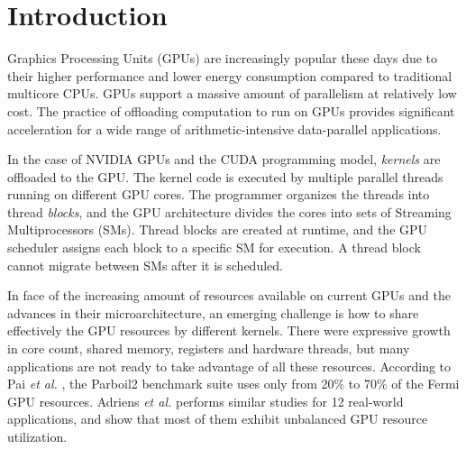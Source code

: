 \documentclass[conference]{IEEEtran}
\begin{document}




%
\IEEEpeerreviewmaketitle

\section{Introduction}
\label{sec:Introduction}

Graphics Processing Units (GPUs) are increasingly popular these days due to their higher performance and lower energy consumption compared to traditional multicore CPUs. GPUs support a massive amount of parallelism at relatively low cost. The practice of offloading computation to run on GPUs provides significant acceleration for a wide range of arithmetic-intensive data-parallel applications. 

In the case of NVIDIA GPUs and the CUDA programming model, \textit{kernels} are offloaded to the GPU. The kernel code is executed by multiple parallel threads running on different GPU cores. The programmer organizes the threads into thread {\it blocks}, and the GPU architecture divides the cores into sets of Streaming Multiprocessors (SMs). Thread blocks are created at runtime, and the GPU scheduler assigns each block to a specific SM for execution. A thread block cannot migrate between SMs after it is scheduled. 

In face of the increasing amount of resources available on current GPUs and the advances in their microarchitecture, an emerging challenge is how to share effectively the GPU resources by different kernels. There were expressive growth in core count, shared memory, registers and hardware threads, but many applications are not ready to take advantage of all these resources.  According to Pai \textit{et al.} \cite{pai2013improving}, the Parboil2 benchmark suite uses only from 20\% to 70\% of the Fermi GPU resources. Adriens \textit{et al.} \cite{adriaens2012case} performs similar studies for 12 real-world applications, and show that most of them exhibit unbalanced GPU resource utilization.
\end{document}
